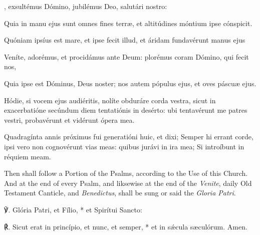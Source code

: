 , exsultémus Dómino, jubilémus Deo, salutári nostro:\par
{}
Quia in manu ejus sunt omnes fines terr{\ae}, et altitúdines móntium ipse cónspicit.\par
Quóniam ipsíus est mare, et ipse fecit illud, et áridam fundavérunt manus ejus\par
Veníte, adorémus, et procidámus ante Deum: plorémus coram Dómino, qui fecit nos,\par
Quia ipse est Dóminus, Deus noster; nos autem pópulus ejus, et oves páscu{\ae} ejus.\par
Hódie, si vocem ejus audiéritis, nolíte obduráre corda vestra, sicut in exacerbatióne secúndum diem tentatiónis in desérto: ubi tentavérunt me patres vestri, probavérunt et vidérunt ópera mea.
\par
Quadragínta annis próximus fui generatióni huic, et dixi; Semper hi errant corde, ipsi vero non cognovérunt vias meas: quibus jurávi in ira mea; Si introíbunt in réquiem meam.

\begin{rubric}
    Then shall follow a Portion of the Psalms, according to the Use of this Church. And at the end of every Psalm, and liksewise at the end of the \emph{Venite}, daily Old Testament Canticle, and \emph{Benedictus}, shall be sung or said the \emph{Gloria Patri}.
\end{rubric}
℣. Glória Patri, et Fílio, * et Spirítui Sancto:\par
℟. Sicut erat in princípio, et nunc, et semper, * et in sǽcula s{\ae}culórum. Amen.

